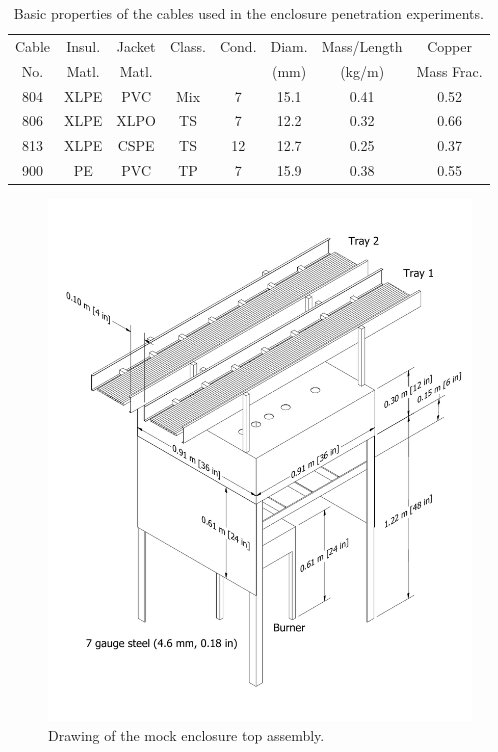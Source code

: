 \begin{table}[ht]
\centering
\caption[Basic properties of cables]{Basic properties of the cables used in the enclosure penetration experiments.}
\label{cables}
\begin{tabular}{|c|c|c|c|c|c|c|c|}
\hline
Cable & Insul.  & Jacket  & Class.  & Cond.  & Diam.  & Mass/Length & Copper     \\
No.   & Matl.   & Matl.   &         &        & (mm)   & (kg/m)      & Mass Frac. \\ \hline
804   & XLPE    & PVC     & Mix     & 7      & 15.1   & 0.41        & 0.52       \\ \hline
806   & XLPE    & XLPO    & TS      & 7      & 12.2   & 0.32        & 0.66       \\ \hline
813   & XLPE    & CSPE    & TS      & 12     & 12.7   & 0.25        & 0.37       \\ \hline
900   & PE      & PVC     & TP      & 7      & 15.9   & 0.38        & 0.55       \\ \hline
\end{tabular}
\end{table}

\begin{figure}[p]
\includegraphics[width=\textwidth]{../FIGURES/Cabinet_Top_Assembly_with_Trays}
\caption[Drawing of mock enclosure top]{Drawing of the mock enclosure top assembly.}
\label{mock_cabinet_with_trays}
\end{figure}

